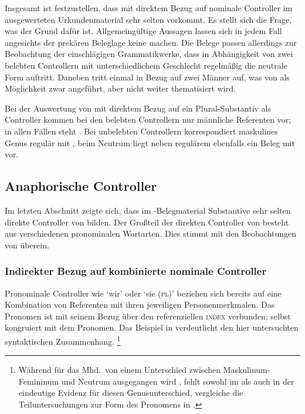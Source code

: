 Insgesamt ist festzustellen, dass  mit direktem Bezug auf
nominale Controller im ausgewerteten Urkundenmaterial sehr selten vorkommt. Es
stellt sich die Frage, was der Grund dafür ist. Allgemeingültige Aussagen
lassen sich in jedem Fall angesichts der prekären Beleglage keine machen. Die
Belege passen allerdings zur Beobachtung der einschlägigen Grammatikwerke, dass
in Abhängigkeit von zwei belebten Controllern mit unterschiedlichem Geschlecht
regelmäßig die neutrale Form  auftritt. Daneben tritt
 einmal in Bezug auf zwei Männer auf, was von
\citet[384]{paul2007} als Möglichkeit zwar angeführt, aber nicht weiter
thematisiert wird.

Bei der Auswertung von  mit direktem Bezug auf ein
Plural-Substantiv als Controller kommen bei den belebten Controllern nur
männliche Referenten vor; in allen Fällen steht . Bei unbelebten
Controllern korrespondiert maskulines Genus regulär mit , beim
Neutrum liegt neben regulärem  ebenfalls ein Beleg mit
 vor.

\subsection{Anaphorische Controller}
\label{subsec:refctrl}

Im letzten Abschnitt zeigte sich, dass im \CAO{}-Belegmaterial
Substantive sehr selten direkte Controller von  bilden. Der
Großteil der direkten Controller von  besteht aus verschiedenen
pronominalen Wortarten.
Dies stimmt mit den Beobachtungen von \citet[624--625]{ksw2} überein.

\subsubsection{Indirekter Bezug auf kombinierte nominale Controller}
\label{subsubsec:beid2p2coordncao}

Pronominale Controller wie `wir' oder `sie (\textsc{pl})' beziehen sich
bereits auf eine Kombination von Referenten mit ihren jeweiligen
Personenmerkmalen. Das Pronomen ist mit seinem Bezug über den referenziellen
\textsc{index} verbunden;  selbst kongruiert mit dem Pronomen. Das
Beispiel in  verdeutlicht den hier untersuchten
syntaktischen Zusammenhang.%
%
	\footnote{Während für das  Mhd.\ von einem Unterschied
		zwischen Maskulinum-Femininum  und Neutrum 
		ausgegangen wird \autocites[vgl.][213--214]{paul2007}[369,
		390--397]{ksw2}, fehlt sowohl im \CAO{} als auch in der
		\KC{} eindeutige Evidenz für diesen Genusunterschied, vergleiche
		die Teiluntersuchungen zur Form des Pronomens in
		.}

